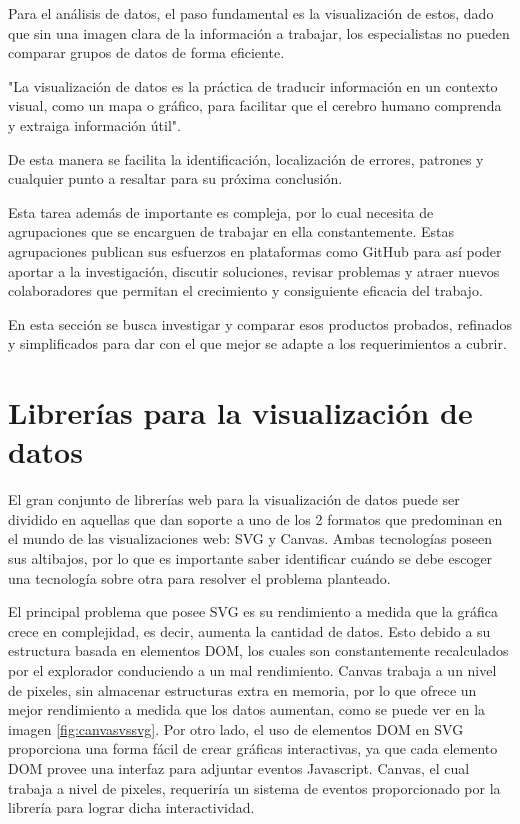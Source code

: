 Para el análisis de datos, el paso fundamental es la visualización de estos, dado que sin una imagen clara de la información a trabajar, los especialistas no pueden comparar grupos de datos de forma eficiente. 

"La visualización de datos es la práctica de traducir información en un contexto visual, como un mapa o gráfico, para facilitar que el cerebro humano comprenda y extraiga información útil". \cite{DefinitionDataViz}

De esta manera se facilita la identificación, localización de errores, patrones y cualquier punto a resaltar para su próxima conclusión.

Esta tarea además de importante es compleja, por lo cual necesita de agrupaciones que se encarguen de trabajar en ella constantemente. Estas agrupaciones publican sus esfuerzos en plataformas como GitHub para así poder aportar a la investigación, discutir soluciones, revisar problemas y atraer nuevos colaboradores que permitan el crecimiento y consiguiente eficacia del trabajo.

En esta sección se busca investigar y comparar esos productos probados, refinados y simplificados para dar con el que mejor se adapte a los requerimientos a cubrir. 




\section{Librerías para la visualización de datos}

El gran conjunto de librerías web para la visualización de datos puede ser dividido en aquellas que dan soporte a uno de los 2 formatos que predominan en el mundo de las visualizaciones web: SVG y Canvas. Ambas tecnologías poseen sus altibajos, por lo que es importante saber identificar cuándo se debe escoger una tecnología sobre otra para resolver el problema planteado. 

El principal problema que posee SVG es su rendimiento a medida que la gráfica crece en complejidad, es decir, aumenta la cantidad de datos. Esto debido a su estructura basada en elementos DOM, los cuales son constantemente recalculados por el explorador conduciendo a un mal rendimiento. Canvas trabaja a un nivel de pixeles, sin almacenar estructuras extra en memoria, por lo que ofrece un mejor rendimiento a medida que los datos aumentan, como se puede ver en la imagen \ref{fig:canvasvssvg}. Por otro lado, el uso de elementos DOM en SVG proporciona una forma fácil de crear gráficas interactivas, ya que cada elemento DOM provee una interfaz para adjuntar eventos Javascript. Canvas, el cual trabaja a nivel de pixeles, requeriría un sistema de eventos proporcionado por la librería para lograr dicha interactividad.

